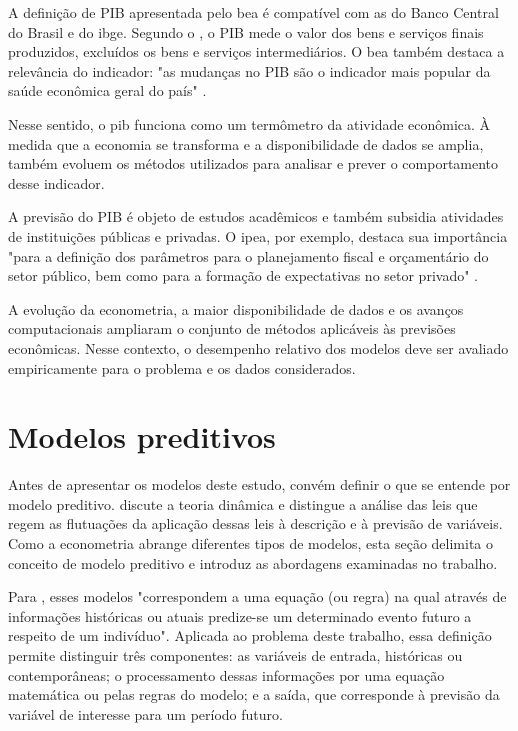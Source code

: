 A definição de PIB apresentada pelo \ac{bea} é compatível com as do Banco Central do Brasil e do \ac{ibge}. Segundo o , o PIB mede o valor dos bens e serviços finais produzidos, excluídos os bens e serviços intermediários. O \ac{bea} também destaca a relevância do indicador: "as mudanças no PIB são o indicador mais popular da saúde econômica geral do país" .


Nesse sentido, o \ac{pib} funciona como um termômetro da atividade econômica. À medida que a economia se transforma e a disponibilidade de dados se amplia, também evoluem os métodos utilizados para analisar e prever o comportamento desse indicador.


A previsão do PIB é objeto de estudos acadêmicos e também subsidia atividades de instituições públicas e privadas. O \ac{ipea}, por exemplo, destaca sua importância "para a definição dos parâmetros para o planejamento fiscal e orçamentário do setor público, bem como para a formação de expectativas no setor privado" .

A evolução da econometria, a maior disponibilidade de dados e os avanços computacionais ampliaram o conjunto de métodos aplicáveis às previsões econômicas. Nesse contexto, o desempenho relativo dos modelos deve ser avaliado empiricamente para o problema e os dados considerados.

\section{Modelos preditivos}

Antes de apresentar os modelos deste estudo, convém definir o que se entende por modelo preditivo.  discute a teoria dinâmica e distingue a análise das leis que regem as flutuações da aplicação dessas leis à descrição e à previsão de variáveis. Como a econometria abrange diferentes tipos de modelos, esta seção delimita o conceito de modelo preditivo e introduz as abordagens examinadas no trabalho.

Para , esses modelos "correspondem a uma equação (ou regra) na qual através de informações históricas ou atuais predize-se um determinado evento futuro a respeito de um indivíduo". Aplicada ao problema deste trabalho, essa definição permite distinguir três componentes: as variáveis de entrada, históricas ou contemporâneas; o processamento dessas informações por uma equação matemática ou pelas regras do modelo; e a saída, que corresponde à previsão da variável de interesse para um período futuro.

